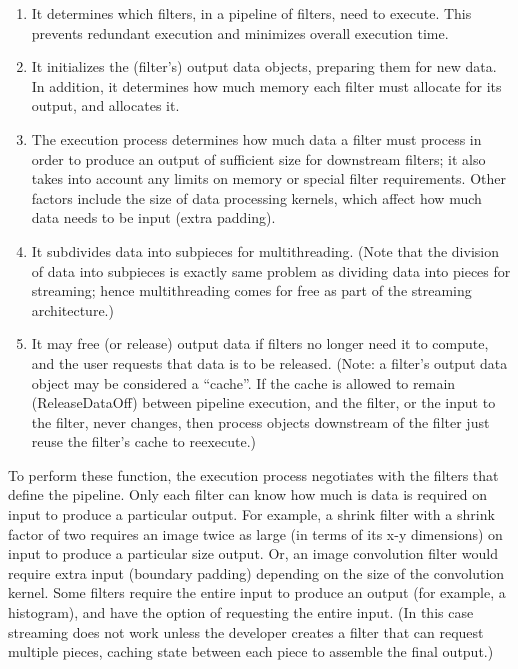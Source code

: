 \begin{enumerate}
        \item It determines which filters, in a pipeline of filters, need to
        execute. This prevents redundant execution and minimizes overall
        execution time.

        \item It initializes the (filter's) output data objects, preparing
        them for new data.  In addition, it determines how much memory each
        filter must allocate for its output, and allocates it.

        \item The execution process determines how much data a filter must
        process in order to produce an output of sufficient size for
        downstream filters; it also takes into account any limits on memory
        or special filter requirements. Other factors include the size of
        data processing kernels, which affect how much data needs to be input
        (extra padding).

        \item It subdivides data into subpieces for multithreading. (Note
        that the division of data into subpieces is exactly same problem as
        dividing data into pieces for streaming; hence multithreading comes
        for free as part of the streaming architecture.)

        \item It may free (or release) output data if filters no longer need
        it to compute, and the user requests that data is to be
        released. (Note: a filter's output data object may be considered a
        ``cache''. If the cache is allowed to remain (ReleaseDataOff) between
        pipeline execution, and the filter, or the input to the filter, never
        changes, then process objects downstream of the filter just reuse the
        filter's cache to reexecute.)
\end{enumerate}

To perform these function, the execution process negotiates with the
filters that define the pipeline. Only each filter can know how much is data is
required on input to produce a particular output. For example, a shrink
filter with a shrink factor of two requires an image twice as large (in terms
of its x-y dimensions) on input to produce a particular size output. Or, an
image convolution filter would require extra input (boundary padding)
depending on the size of the convolution kernel. Some filters require the
entire input to produce an output (for example, a histogram), and have the
option of requesting the entire input. (In this case streaming does not work
unless the developer creates a filter that can request multiple pieces,
caching state between each piece to assemble the final output.)



